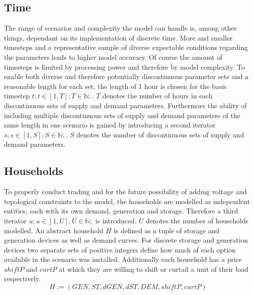 \documentclass[
	11pt,								%
	DIV10,								%
	a4paper,         					%
	oneside,							%
	headheight=20pt,					%
	footheight=20pt,					%
    parskip=full,						%
    listof=totoc,						%
	bibliography=totoc,					%
	index=totoc,						%
]{scrartcl}
\begin{document}
\subsection{Time}
The range of scenarios and complexity the model can handle is, among other things, dependant on its implementation of discrete time. More and smaller timesteps and a representative sample of diverse expectable conditions regarding the parameters leads to higher model accuracy. Of course the amount of timesteps is limited by processing power and therefore by model complexity. To enable both diverse and therefore potentially discontinuous parameter sets and a reasonable length for each set, the length of 1 hour is chosen for the basic timestep 
$t; t \in [1,T]; T \in \mathbb{N} ;$. $T$ denotes the number of hours in each discontinuous sets of supply and demand parameters.
Furthermore the ability of including multiple discontinuous sets of supply and demand parameters of the same length in one scenario is gained by introducing a second iterator 
$s; s \in [1,S]; S \in \mathbb{N} ;$. $S$ denotes the number of discontinuous sets of supply and demand parameters.





\subsection{Households}
To properly conduct trading and for the future possibility of adding voltage and topological constraints to the model, the households are modelled as independent entities, each with its own demand, generation and storage. Therefore a third iterator $u; u \in [1,U]; U \in \mathbb{N};$ is introduced. $U$ denotes the number of households modelled.
An abstract household $H$ is defined as a tuple of storage and generation devices as well as demand curves. For discrete storage and generation devices two separate sets of positive integers define how much of each option available in the scenario was installed. Additionally each household has a price $shiftP$ and $curtP$ at which they are willing to shift or curtail a unit  of their load respectively.
\begin{equation}
	H := (GEN, ST, dGEN, dST, DEM, shiftP, curtP)
\end{equation}
\end{document}
